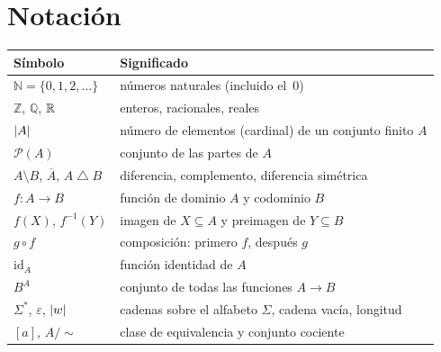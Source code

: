 \documentclass[11pt,a4paper,twoside,openany]{book}
\newcommand{\N}{\mathbb{N}}
\newcommand{\Z}{\mathbb{Z}}
\newcommand{\Q}{\mathbb{Q}}
\newcommand{\Pa}{\mathcal{P}}
\newcommand{\id}{\mathrm{id}}
\newcommand{\vacia}{\varepsilon}
\newcommand{\dsim}{\mathbin{\triangle}}
\begin{document}
\section*{Notación}
\begin{center}
\begin{tabular}{@{}ll@{}}
\toprule
Símbolo & Significado \\
\midrule
$\N=\{0,1,2,\dots\}$ & números naturales (incluido el~0) \\
$\Z$, $\Q$, $\mathbb{R}$ & enteros, racionales, reales \\
$\lvert A\rvert$ & número de elementos (cardinal) de un conjunto finito $A$ \\
$\Pa(A)$ & conjunto de las partes de $A$ \\
$A\setminus B$, $\overline{A}$, $A\dsim B$ & diferencia, complemento, diferencia simétrica \\
$f\colon A\to B$ & función de dominio $A$ y codominio $B$ \\
$f(X)$, $f^{-1}(Y)$ & imagen de $X\subseteq A$ y preimagen de $Y\subseteq B$ \\
$g\circ f$ & composición: primero $f$, después $g$ \\
$\id_A$ & función identidad de $A$ \\
$B^{A}$ & conjunto de todas las funciones $A\to B$ \\
$\Sigma^{*}$, $\vacia$, $\lvert w\rvert$ & cadenas sobre el alfabeto $\Sigma$, cadena vacía, longitud \\
$[a]$, $A/{\sim}$ & clase de equivalencia y conjunto cociente \\
\bottomrule
\end{tabular}
\end{center}

\tableofcontents

\mainmatter







\appendix


\backmatter

\end{document}
